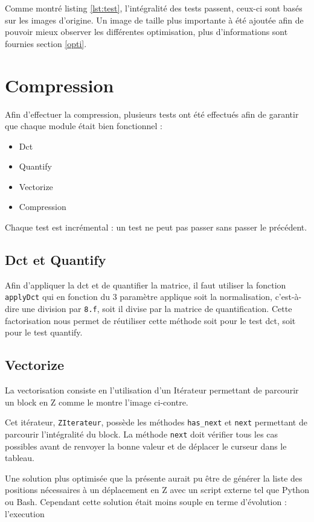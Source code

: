\documentclass[a4paper, 11pt]{article}
\begin{document}
	Comme montré listing \ref{lst:test}, l'intégralité des tests passent, ceux-ci sont basés sur les images d'origine. Un image de taille plus importante à été
	ajoutée afin de pouvoir mieux observer les différentes optimisation, plus d'informations sont fournies section \ref{opti}.

	\section{Compression}
	Afin d'effectuer la compression, plusieurs tests ont été effectués afin de garantir que chaque module était bien fonctionnel : 
	\begin{itemize}
		\item Dct
		\item Quantify
		\item Vectorize
		\item Compression
	\end{itemize}

	Chaque test est incrémental : un test ne peut pas passer sans passer le précédent.

	\subsection{Dct et Quantify}
	Afin d'appliquer la dct et de quantifier la matrice, il faut utiliser la fonction \texttt{applyDct} qui en fonction du 3\ieme{} paramètre applique soit la
	normalisation, c'est-à-dire une division par \texttt{8.f}, soit il divise par la matrice de quantification. Cette factorisation nous permet de réutiliser
	cette méthode soit pour le test dct, soit pour le test quantify. 

	\subsection{Vectorize}
	La vectorisation consiste en l'utilisation d'un Itérateur permettant de parcourir un block en Z comme le montre l'image ci-contre.

	Cet itérateur, \texttt{ZIterateur}, possède les méthodes \texttt{has\_next} et \texttt{next} permettant de parcourir l'intégralité du block. La méthode
	\texttt{next} doit vérifier tous les cas possibles avant de renvoyer la bonne valeur et de déplacer le curseur dans le tableau. 

	Une solution plus optimisée que la présente aurait pu être de générer la liste des positions nécessaires à un déplacement en Z avec un script externe tel que
	Python ou Bash. Cependant cette solution était moins souple en terme d'évolution : l'execution 
\end{document}
